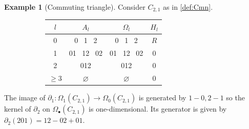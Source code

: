 \documentclass[11pt]{article}
\theoremstyle{definition}
\newtheorem{example}[theo]{Example}
\numberwithin{equation}{section}
\newcommand{\bd}{\partial}
\begin{document}
\begin{example}[Commuting triangle] \label{ex:commuting_triangle_homology}
Consider $C_{2,1}$ as in \cref{def:Cmn}.

 \begin{figure}[H]
        \centering
 \begin{subfigure}[c]{0.3\textwidth}
\end{subfigure}
\begin{subfigure}[c]{0.6\textwidth}
        \centering
    \begin{tabular}{||c||  c | c| c ||} 
 \hline
 $l$ &  $A_l$ & $\Omega_l$ & $H_l$ \\ [.5ex] 
 \hline\hline
0 &  0 \, 1 \, 2 & 0 \, 1 \, 2  & $R$\\ 
 \hline
 1 &  01 \, 12 \, 02 & 01 \, 12 \, 02 & 0  \\
 \hline
 2 & 012 & 012 & 0\\
 \hline
 $\geq 3$ & $\varnothing$ & $\varnothing$ & 0 \\
 \hline
\end{tabular} 
\end{subfigure}
    \end{figure}  
The image of $\bd_1:\Omega_1(C_{2,1}) \to \Omega_0(C_{2,1})$ is generated by $1-0, 2-1$ so the kernel of $\bd_2$ on $\Omega_\bullet (C_{2,1})$ is one-dimensional. Its generator is given by $\bd_2(201)=12-02+01$.
\end{example}
\end{document}
